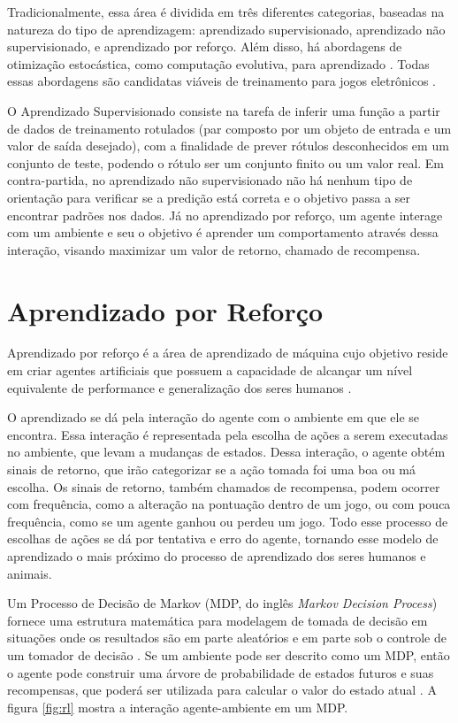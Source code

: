 Tradicionalmente, essa área é dividida em três diferentes categorias, baseadas na natureza do tipo de aprendizagem: aprendizado supervisionado, aprendizado não supervisionado, e aprendizado por reforço. Além disso, há abordagens de otimização estocástica, como computação evolutiva, para aprendizado \cite{Salimans2017}. Todas essas abordagens são candidatas viáveis de treinamento para jogos eletrônicos \cite{justesen2018}.

O Aprendizado Supervisionado consiste na tarefa de inferir uma função a partir de dados de treinamento rotulados (par composto por um objeto de entrada e um valor de saída desejado), com a finalidade de prever rótulos desconhecidos em um conjunto de teste, podendo o rótulo ser um conjunto finito ou um valor real. Em contra-partida, no aprendizado não supervisionado não há nenhum tipo de orientação para verificar se a predição está correta e o objetivo passa a ser encontrar padrões nos dados. Já no aprendizado por reforço, um agente interage com um ambiente e seu o objetivo é aprender um comportamento através dessa interação, visando maximizar um valor de retorno, chamado de recompensa.

\section{Aprendizado por Reforço}

Aprendizado por reforço é a área de aprendizado de máquina cujo objetivo reside em criar agentes artificiais que possuem a capacidade de alcançar um nível equivalente de performance e generalização dos seres humanos \cite{deepmind}. 

O aprendizado se dá pela interação do agente com o ambiente em que ele se encontra. Essa interação é representada pela escolha de ações a serem executadas no ambiente, que levam a mudanças de estados. Dessa interação, o agente obtém sinais de retorno, que irão categorizar se a ação tomada foi uma boa ou má escolha. Os sinais de retorno, também chamados de recompensa, podem ocorrer com frequência, como a alteração na pontuação dentro de um jogo, ou com pouca frequência, como se um agente ganhou ou perdeu um jogo. Todo esse processo de escolhas de ações se dá por tentativa e erro do agente, tornando esse modelo de aprendizado o mais próximo do processo de aprendizado dos seres humanos e animais.

Um Processo de Decisão de Markov (MDP, do inglês \textit{Markov Decision Process}) fornece uma estrutura matemática para modelagem de tomada de decisão em situações onde os resultados são em parte aleatórios e em parte sob o controle de um tomador de decisão \cite{sutton-barto98}. Se um ambiente pode ser descrito como um MDP, então o agente pode construir uma árvore de probabilidade de estados futuros e suas recompensas, que poderá ser utilizada para calcular o valor do estado atual \cite{Lapan2018}. A figura \ref{fig:rl} mostra a interação agente-ambiente em um MDP.


